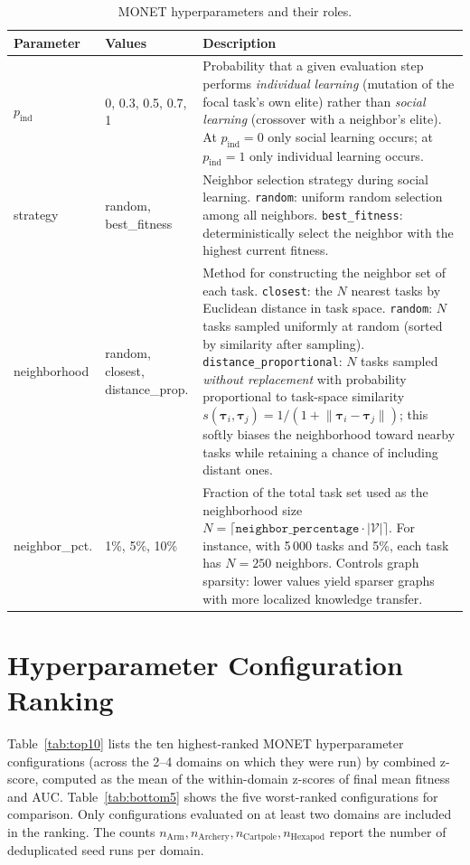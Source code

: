 \begin{table}[h]
\centering
\caption{MONET hyperparameters and their roles.}
\label{tab:monet-hyperparams}
\renewcommand{\arraystretch}{1.3}
\small
\begin{tabular}{@{}p{2.4cm}p{2.2cm}p{7.4cm}@{}}
\toprule
\textbf{Parameter} & \textbf{Values} & \textbf{Description} \\
\midrule
$p_\text{ind}$ &
0, 0.3, 0.5, 0.7, 1 &
Probability that a given evaluation step performs \emph{individual learning} (mutation of the focal task's own elite) rather than \emph{social learning} (crossover with a neighbor's elite). At $p_\text{ind}=0$ only social learning occurs; at $p_\text{ind}=1$ only individual learning occurs. \\
\addlinespace
strategy &
random, best\_fitness &
Neighbor selection strategy during social learning. \texttt{random}: uniform random selection among all neighbors. \texttt{best\_fitness}: deterministically select the neighbor with the highest current fitness. \\
\addlinespace
neighborhood &
random, closest, distance\_prop. &
Method for constructing the neighbor set of each task.
\texttt{closest}: the $N$ nearest tasks by Euclidean distance in task space.
\texttt{random}: $N$ tasks sampled uniformly at random (sorted by similarity after sampling).
\texttt{distance\_proportional}: $N$ tasks sampled \emph{without replacement} with probability proportional to task-space similarity $s(\boldsymbol{\tau}_i, \boldsymbol{\tau}_j) = 1/(1 + \lVert \boldsymbol{\tau}_i - \boldsymbol{\tau}_j \rVert)$; this softly biases the neighborhood toward nearby tasks while retaining a chance of including distant ones. \\
\addlinespace
neighbor\_pct. &
1\%, 5\%, 10\% &
Fraction of the total task set used as the neighborhood size~$N = \lceil \texttt{neighbor\_percentage} \cdot |\mathcal{V}| \rceil$. For instance, with 5\,000 tasks and 5\%, each task has $N=250$ neighbors. Controls graph sparsity: lower values yield sparser graphs with more localized knowledge transfer. \\
\bottomrule
\end{tabular}
\end{table}


\section{Hyperparameter Configuration Ranking}\label{app:ranking}

Table~\ref{tab:top10} lists the ten highest-ranked MONET hyperparameter configurations (across the 2--4 domains on which they were run) by combined z-score, computed as the mean of the within-domain z-scores of final mean fitness and AUC. Table~\ref{tab:bottom5} shows the five worst-ranked configurations for comparison. Only configurations evaluated on at least two domains are included in the ranking. The counts $n_{\text{Arm}}, n_{\text{Archery}}, n_{\text{Cartpole}}, n_{\text{Hexapod}}$ report the number of deduplicated seed runs per domain.

